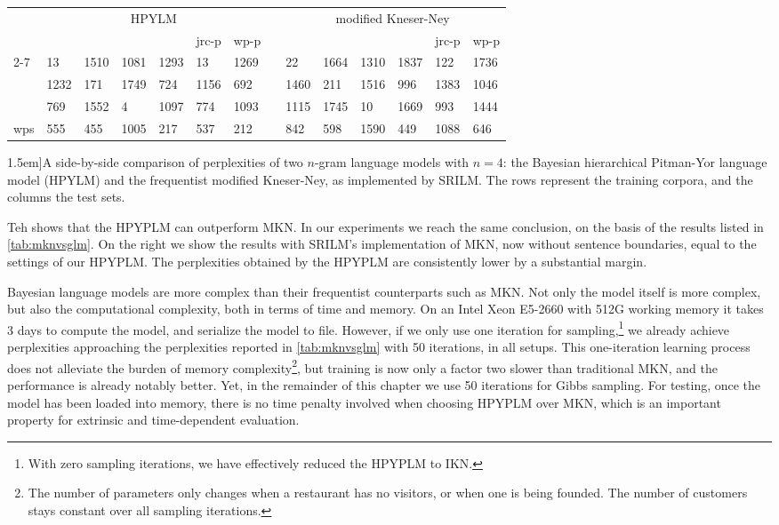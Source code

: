 \begin{table*}
	\begin{tabular}{l*{6}{l}l*{6}{l}}
		&  \multicolumn{6}{c}{HPYLM} & &  \multicolumn{6}{c}{modified Kneser-Ney} \\
		& \jrc	& \obw	& \emea	&	\wp	& jrc-p	& wp-p & & \jrc	& \obw &	\emea & \wp&  jrc-p & wp-p\\ \cline{2-7}\cline{9-14}
		\jrc	& 13 & 1510 & 1081 & 1293 & 13 & 1269 & & 22 & 1664 & 1310 & 1837 & 122 & 1736 \\
		\obw & 1232 & 171 & 1749 & 724 & 1156 & 692 & & 1460 & 211 & 1516 & 996 & 1383 & 1046 \\
		\emea & 769 & 1552 & 4 & 1097 & 774 & 1093 & & 1115 & 1745 & 10 &1669 & 993 & 1444 \\
		wps & 555 & 455 & 1005 & 217 & 537 & 212 & & 842 & 598 & 1590 & 449 & 1088 & 646
	\end{tabular}
	\caption[][1.5em]{A side-by-side comparison of perplexities of two $n$-gram language models with $n=4$: the Bayesian hierarchical Pitman-Yor language model (HPYLM) and the frequentist modified Kneser-Ney, as implemented by SRILM. The rows represent the training corpora, and the columns the test sets. }\label{tab:mknvsglm}
\end{table*}

Teh shows that the HPYPLM can outperform MKN. In our experiments we reach the same conclusion, on the basis of the results listed in \cref{tab:mknvsglm}. On the right we show the results with SRILM's implementation of MKN, now without sentence boundaries, equal to the settings of our HPYPLM. The perplexities obtained by the HPYPLM are consistently lower by a substantial margin.

Bayesian language models are more complex than their frequentist counterparts such as MKN. Not only the model itself is more complex, but also the computational complexity, both in terms of time and memory. On an Intel Xeon E5-2660 with 512G working memory it takes 3 days to compute the \obw model, and serialize the model to file. However, if we only use one iteration for sampling,\footnote{With zero sampling iterations, we have effectively reduced the HPYPLM to IKN.} we already achieve perplexities approaching the perplexities reported in \cref{tab:mknvsglm} with 50 iterations, in all setups. This one-iteration learning process does not alleviate the burden of memory complexity\footnote{The number of parameters only changes when a restaurant has no visitors, or when one is being founded. The number of customers stays constant over all sampling iterations.}, but training is now only a factor two slower than traditional MKN, and the performance is already notably better.
Yet, in the remainder of this chapter we use 50 iterations for Gibbs sampling. For testing, once the model has been loaded into memory, there is no time penalty involved when choosing HPYPLM over MKN, which is an important property for extrinsic and time-dependent evaluation.

